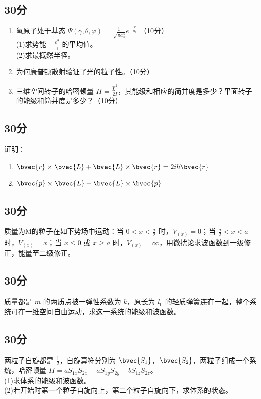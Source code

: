 
\subsection{30分}
\begin{enumerate}
\item 氢原子处于基态 $\varPsi(\gamma,\theta,\varphi)=\frac{1}{\sqrt{\pi a^{3}_{0}}}e^{-\frac{r}{a_0}}$ （10分）\\
(1)求势能 $-\frac{e^2}{\gamma}$ 的平均值。\\
(2)求最概然半径。\\
\item 为何康普顿散射验证了光的粒子性。（10分）\\
\item 三维空间转子的哈密顿量 $H=\frac{\hat{L}^2}{2I}$，其能级和相应的简并度是多少？平面转子的能级和简并度是多少？（10分）\\
\end{enumerate}
\subsection{30分}
证明：\\
\begin{enumerate}
\item $\bvec{r}\times \bvec{L}+ \bvec{L}\times \bvec{r} = 2i\hbar \bvec{r}$
\item $\bvec{p}\times\bvec{L}+\bvec{L}\times\bvec{p}$
\end{enumerate}
\subsection{30分}
质量为M的粒子在如下势场中运动：当 $0<x<\frac{a}{2}$ 时，$V_{(x)}=0$；当 $\frac{a}{2} <x<a$ 时，$V_{(x)}=x$；当 $x \le 0$ 或 $x \ge a$ 时，$V_{(x)}=\infty$，用微扰论求波函数到一级修正，能量至二级修正。
\subsection{30分}
质量都是 $m$ 的两质点被一弹性系数为 $k$，原长为 $l_{0}$ 的轻质弹簧连在一起，整个系统可在一维空间自由运动，求这一系统的能级和波函数。
\subsection{30分}
两粒子自旋都是 $\frac{1}{2}$，自旋算符分别为 $\bvec{S_{1}}$，$\bvec{S_{2}}$，两粒子组成一个系统，哈密顿量 $H=aS_{1x}S_{2x}+aS_{1y}S_{2y}+bS_{1z}S_{2z}$。\\
(1)求体系的能级和波函数。\\
(2)若开始时第一个粒子自旋向上，第二个粒子自旋向下，求体系的状态。\\

